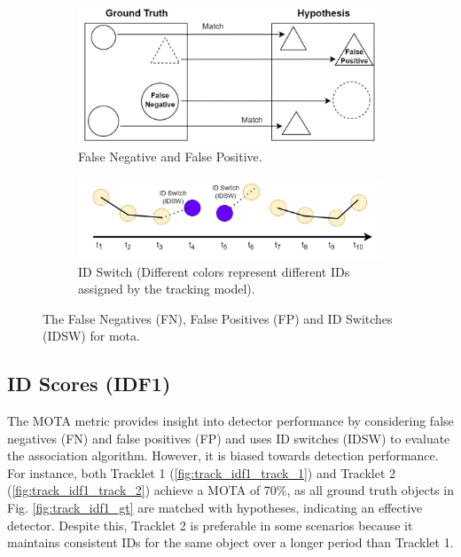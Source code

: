 \begin{figure}[H]
    \centering
    \begin{subfigure}[b]{\textwidth}
        \centering
        \includegraphics[width=\linewidth]{figures/chapter_tracking/MOTA_FP_FN.jpg}
        \caption{False Negative and False Positive.}
        \label{fig:track_mota_fp_fn} 
    \end{subfigure}
    \begin{subfigure}[b]{\textwidth}
        \centering
        \includegraphics[width=\linewidth]{figures/chapter_tracking/MOTA_IDSW.jpg}
        \caption{ID Switch (Different colors represent different IDs assigned by the tracking model).}
        \label{fig:track_mota_idsw}
    \end{subfigure}
  \caption{The False Negatives (FN), False Positives (FP) and ID Switches (IDSW) for \acrfull{mota}.}
  \label{fig:tracking_mota}
\end{figure}

\subsection{ID Scores (IDF1)}

The MOTA metric provides insight into detector performance by considering false negatives (FN) and false positives (FP) and uses ID switches (IDSW) to evaluate the association algorithm. However, it is biased towards detection performance. For instance, both Tracklet 1 (\ref{fig:track_idf1_track_1}) and Tracklet 2 (\ref{fig:track_idf1_track_2}) achieve a MOTA of 70\%, as all ground truth objects in Fig. \ref{fig:track_idf1_gt} are matched with hypotheses, indicating an effective detector. Despite this, Tracklet 2 is preferable in some scenarios because it maintains consistent IDs for the same object over a longer period than Tracklet 1.


